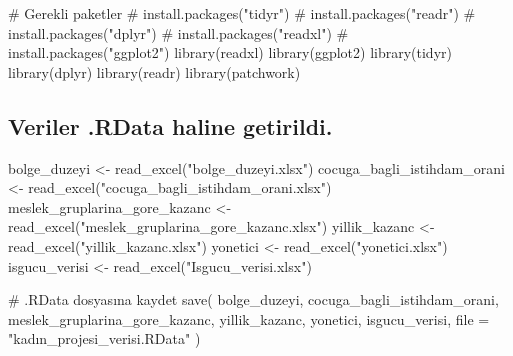 \documentclass[
  11pt,
  a4paper,
  DIV=11,
  numbers=noendperiod]{scrartcl}
\newenvironment{Shaded}{\begin{snugshade}}{\end{snugshade}}
\newcommand{\AttributeTok}[1]{\textcolor[rgb]{0.40,0.45,0.13}{#1}}
\newcommand{\CommentTok}[1]{\textcolor[rgb]{0.37,0.37,0.37}{#1}}
\newcommand{\FunctionTok}[1]{\textcolor[rgb]{0.28,0.35,0.67}{#1}}
\newcommand{\NormalTok}[1]{\textcolor[rgb]{0.00,0.23,0.31}{#1}}
\newcommand{\OtherTok}[1]{\textcolor[rgb]{0.00,0.23,0.31}{#1}}
\newcommand{\StringTok}[1]{\textcolor[rgb]{0.13,0.47,0.30}{#1}}
\begin{document}
\begin{Shaded}
\begin{Highlighting}[]
\CommentTok{\# Gerekli paketler}
\CommentTok{\# install.packages("tidyr")}
\CommentTok{\# install.packages("readr")}
\CommentTok{\# install.packages("dplyr")}
\CommentTok{\# install.packages("readxl")}
\CommentTok{\# install.packages("ggplot2")}
\FunctionTok{library}\NormalTok{(readxl)}
\FunctionTok{library}\NormalTok{(ggplot2)}
\FunctionTok{library}\NormalTok{(tidyr)}
\FunctionTok{library}\NormalTok{(dplyr)}
\FunctionTok{library}\NormalTok{(readr)}
\FunctionTok{library}\NormalTok{(patchwork)}
\end{Highlighting}
\end{Shaded}

\subsection{Veriler .RData haline
getirildi.}\label{veriler-.rdata-haline-getirildi.}

\begin{Shaded}
\begin{Highlighting}[]
\NormalTok{bolge\_duzeyi }\OtherTok{\textless{}{-}} \FunctionTok{read\_excel}\NormalTok{(}\StringTok{"bolge\_duzeyi.xlsx"}\NormalTok{)}
\NormalTok{cocuga\_bagli\_istihdam\_orani }\OtherTok{\textless{}{-}} \FunctionTok{read\_excel}\NormalTok{(}\StringTok{"cocuga\_bagli\_istihdam\_orani.xlsx"}\NormalTok{)}
\NormalTok{meslek\_gruplarina\_gore\_kazanc }\OtherTok{\textless{}{-}} \FunctionTok{read\_excel}\NormalTok{(}\StringTok{"meslek\_gruplarina\_gore\_kazanc.xlsx"}\NormalTok{)}
\NormalTok{yillik\_kazanc }\OtherTok{\textless{}{-}} \FunctionTok{read\_excel}\NormalTok{(}\StringTok{"yillik\_kazanc.xlsx"}\NormalTok{)}
\NormalTok{yonetici }\OtherTok{\textless{}{-}} \FunctionTok{read\_excel}\NormalTok{(}\StringTok{"yonetici.xlsx"}\NormalTok{)}
\NormalTok{isgucu\_verisi }\OtherTok{\textless{}{-}} \FunctionTok{read\_excel}\NormalTok{(}\StringTok{"Isgucu\_verisi.xlsx"}\NormalTok{)}

\CommentTok{\# .RData dosyasına kaydet}
\FunctionTok{save}\NormalTok{(}
\NormalTok{  bolge\_duzeyi,}
\NormalTok{  cocuga\_bagli\_istihdam\_orani,}
\NormalTok{  meslek\_gruplarina\_gore\_kazanc,}
\NormalTok{  yillik\_kazanc,}
\NormalTok{  yonetici,}
\NormalTok{  isgucu\_verisi,}
  \AttributeTok{file =} \StringTok{"kadın\_projesi\_verisi.RData"}
\NormalTok{)}
\end{Highlighting}
\end{Shaded}
\end{document}
